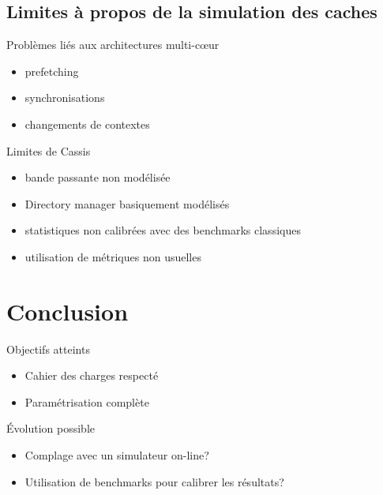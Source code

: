 \subsection{Limites \`a  propos de la simulation des caches}
\begin{frame}
  \begin{block}{Probl\`emes li\'es aux architectures multi-c{\oe}ur}
    \begin{itemize}
      \item \textsf{prefetching}
      \item synchronisations
      \item changements de contextes 
    \end{itemize}
  \end{block}
  \begin{block}{Limites de \textsf{Cassis}}
    \begin{itemize}
      \item bande passante non mod\'elis\'ee
      \item \textsf{Directory manager} basiquement mod\'elis\'es
      \item statistiques non calibr\'ees avec des benchmarks classiques
      \item utilisation de m\'etriques non usuelles
    \end{itemize}
  \end{block}
\end{frame}


\section*{Conclusion}
\begin{frame}
  \begin{block}{Objectifs atteints}
    \begin{itemize}
      \item Cahier des charges respect\'e
      \item Param\'etrisation compl\`ete
    \end{itemize}
  \end{block}

  \begin{block}{\'Evolution possible}
    \begin{itemize}
      \item Complage avec un simulateur \textsf{on-line}?
      \item Utilisation de benchmarks pour calibrer les r\'esultats?
    \end{itemize}
  \end{block}
\end{frame}
